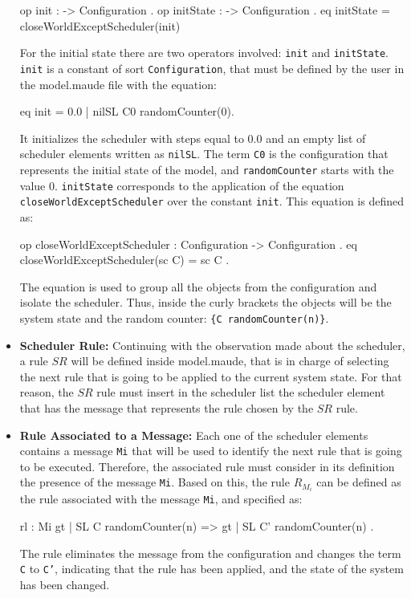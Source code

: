 \begin{itemize}
\begin{maude}
op init : -> Configuration .
op initState : -> Configuration .
eq initState = closeWorldExceptScheduler(init) \end{maude}
    For the initial state there are two operators involved: \texttt{init} and \texttt{initState}. \texttt{init} is a constant of sort \texttt{Configuration}, that must be defined by the user in the model.maude file with the equation:
    \begin{maude}

eq init = {0.0 | nilSL} C0 randomCounter(0). \end{maude}
    It initializes the scheduler with steps equal to 0.0 and an empty list of scheduler elements written as \texttt{nilSL}. The term \texttt{C0} is the configuration that represents the initial state of the model, and \texttt{randomCounter} starts with the value 0. \texttt{initState} corresponds to the application of the equation \texttt{closeWorldExceptScheduler} over the constant \texttt{init}. This equation is defined as:
    \begin{maude}
    
op closeWorldExceptScheduler : Configuration -> Configuration .
eq closeWorldExceptScheduler(sc C) = sc { C } .\end{maude}
    The equation is used to group all the objects from the configuration and isolate the scheduler. Thus, inside the curly brackets the objects will be the system state and the random counter: \texttt{\{C randomCounter(n)\}}.   
    
\item \textbf{Scheduler Rule:} Continuing with the observation made about the scheduler, a rule $SR$ will be defined inside model.maude, that is in charge of selecting the next rule that is going to be applied to the current system state. For that reason, the $SR$ rule must insert in the scheduler list the scheduler element that has the message that represents the rule chosen by the $SR$ rule.

\item \textbf{Rule Associated to a Message:} Each one of the scheduler elements contains a message \texttt{Mi} that will be used to identify the next rule that is going to be executed. Therefore, the associated rule must consider in its definition the presence of the message \texttt{Mi}. Based on this, the rule $R_{M_i}$ can be defined as the rule associated with the message \texttt{Mi}, and specified as:
\begin{maude}

rl : Mi {gt | SL} {C randomCounter(n)} =>
        {gt | SL} {C' randomCounter(n)} .\end{maude}
The rule eliminates the message from the configuration and changes the term \texttt{C} to \texttt{C'}, indicating that the rule has been applied, and the state of the system has been changed.


\end{itemize}
